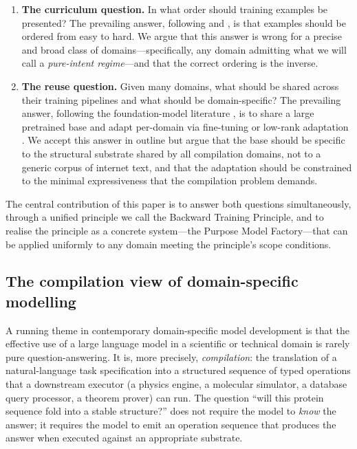 \documentclass[twocolumn,11pt,a4paper]{article}
\begin{document}
\begin{enumerate}[leftmargin=*,itemsep=2pt]
\item \textbf{The curriculum question.} In what order should training examples be presented? The prevailing answer, following \citet{elman1993learning} and \citet{bengio2009curriculum}, is that examples should be ordered from easy to hard. We argue that this answer is wrong for a precise and broad class of domains---specifically, any domain admitting what we will call a \emph{pure-intent regime}---and that the correct ordering is the inverse.
\item \textbf{The reuse question.} Given many domains, what should be shared across their training pipelines and what should be domain-specific? The prevailing answer, following the foundation-model literature \citep{bommasani2021opportunities,brown2020language}, is to share a large pretrained base and adapt per-domain via fine-tuning or low-rank adaptation \citep{hu2022lora}. We accept this answer in outline but argue that the base should be specific to the structural substrate shared by all compilation domains, not to a generic corpus of internet text, and that the adaptation should be constrained to the minimal expressiveness that the compilation problem demands.
\end{enumerate}

The central contribution of this paper is to answer both questions simultaneously, through a unified principle we call the Backward Training Principle, and to realise the principle as a concrete system---the Purpose Model Factory---that can be applied uniformly to any domain meeting the principle's scope conditions.

\subsection{The compilation view of domain-specific modelling}
\label{sec:compilation-view}

A running theme in contemporary domain-specific model development is that the effective use of a large language model in a scientific or technical domain is rarely pure question-answering. It is, more precisely, \emph{compilation}: the translation of a natural-language task specification into a structured sequence of typed operations that a downstream executor (a physics engine, a molecular simulator, a database query processor, a theorem prover) can run. The question ``will this protein sequence fold into a stable structure?'' does not require the model to \emph{know} the answer; it requires the model to emit an operation sequence that produces the answer when executed against an appropriate substrate.
\end{document}
